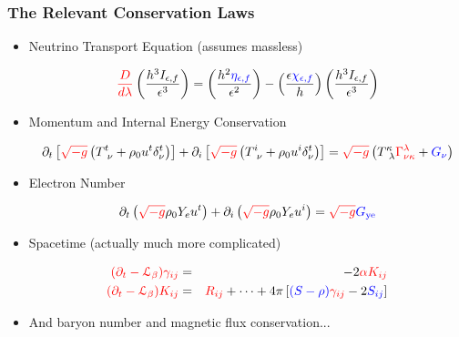 \documentclass[]{beamer}
\newcommand{\paren}[1]{\left( #1 \right)}
\newcommand{\sqrbrace}[1]{\left[ #1 \right]}
\newcommand{\detg}{\sqrt{-g}}
\newcommand{\eepsilon}{\epsilon} %
\newcommand{\etanuf}{\eta_{\eepsilon,f}}
\newcommand{\Inuf}{I_{\eepsilon,f}}
\newcommand{\chinuf}{\chi_{\eepsilon,f}}
\begin{document}
\begin{frame}
  \frametitle{The Relevant Conservation Laws}
  \begin{itemize}
  \item Neutrino Transport Equation (assumes massless)
    \begin{small}
      \begin{displaymath}
        {\color{red}\frac{D}{d\lambda}}\paren{\frac{h^3\Inuf}{\eepsilon^3}}
        = \paren{\frac{h^2{\color{blue}\etanuf}}{\eepsilon^2}}
        - \paren{\frac{\eepsilon {\color{blue}\chinuf}}{h}} \paren{\frac{h^3\Inuf}{\eepsilon^3}}
      \end{displaymath}
    \end{small}
  \item Momentum and Internal Energy Conservation
    \begin{small}
      \begin{displaymath}
        \partial_t\sqrbrace{{\color{red}\detg} \paren{T^t_{\ \nu} + \rho_0u^t \delta^t_\nu}}
        + \partial_i\sqrbrace{{\color{red}\detg}\paren{T^i_{\ \nu} + \rho_0 u^i \delta^t_\nu}}
        = {\color{red}\detg} \paren{T^\kappa_{\ \lambda} {\color{red}\Gamma^\lambda_{\nu\kappa}} + {\color{blue}G_\nu}}
      \end{displaymath}
    \end{small}
  \item Electron Number
    \begin{small}
      \begin{displaymath}
        \partial_t\paren{{\color{red}\detg}\rho_0 Y_e u^t}
        + \partial_i\paren{{\color{red}\detg}\rho_0Y_eu^i}
        = {\color{red}\detg} {\color{blue}G_{\text{ye}}}
      \end{displaymath}
    \end{small}
  \item Spacetime (actually much more complicated)
    \begin{small}
      \begin{eqnarray}
        {\color{red}(\partial_t - \mathcal{L}_\beta) \gamma_{ij}} &=& -2{\color{red}\alpha K_{ij}}\nonumber\\
        {\color{red}(\partial_t - \mathcal{L}_\beta) K_{ij}} &=& {\color{red}R_{ij}} + \cdots + 4\pi \left[{\color{blue}(S-\rho)}{\color{red}\gamma_{ij}} - 2{\color{blue} S_{ij}}\right]\nonumber
      \end{eqnarray}
    \end{small}
  \item And baryon number and magnetic flux conservation...
  \end{itemize}
\end{frame}
\end{document}
